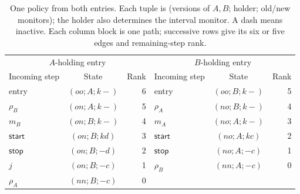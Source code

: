 \begin{table}[!htbp]
\caption{One policy from both entries. Each tuple is (versions of $A,B$; holder; old/new monitors); the holder also determines the interval monitor. A dash means inactive. Each column block is one path; successive rows give its six or five edges and remaining-step rank.}
\label{tab:cell-paths}
\centering\small
\begin{tabular}{@{}lcr@{\qquad}lcr@{}}\toprule
\multicolumn{3}{c}{$A$-holding entry} & \multicolumn{3}{c}{$B$-holding entry}\\
Incoming step & State & Rank & Incoming step & State & Rank\\\midrule
entry & $(oo;A;k{-})$ & 6 & entry & $(oo;B;k{-})$ & 5\\
$\rho_B$ & $(on;A;k{-})$ & 5 & $\rho_A$ & $(no;B;k{-})$ & 4\\
$m_B$ & $(on;B;k{-})$ & 4 & $m_A$ & $(no;A;k{-})$ & 3\\
$\mathsf{start}$ & $(on;B;kd)$ & 3 & $\mathsf{start}$ & $(no;A;kc)$ & 2\\
$\mathsf{stop}$ & $(on;B;{-}d)$ & 2 & $\mathsf{stop}$ & $(no;A;{-}c)$ & 1\\
$j$ & $(on;B;{-}c)$ & 1 & $\rho_B$ & $(nn;A;{-}c)$ & 0\\
$\rho_A$ & $(nn;B;{-}c)$ & 0 & & & \\\bottomrule
\end{tabular}
\end{table}
